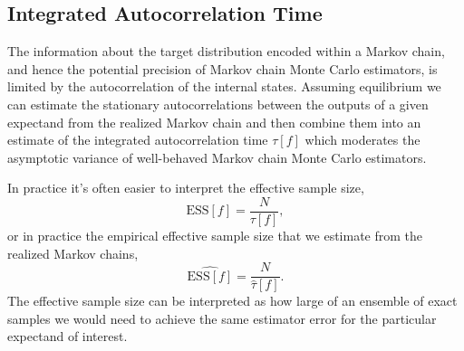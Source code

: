 \documentclass[
  letterpaper,
  DIV=11,
  numbers=noendperiod]{scrartcl}
\begin{document}
\hypertarget{integrated-autocorrelation-time}{%
\subsection{Integrated Autocorrelation
Time}\label{integrated-autocorrelation-time}}

The information about the target distribution encoded within a Markov
chain, and hence the potential precision of Markov chain Monte Carlo
estimators, is limited by the autocorrelation of the internal states.
Assuming equilibrium we can estimate the stationary autocorrelations
between the outputs of a given expectand from the realized Markov chain
and then combine them into an estimate of the integrated autocorrelation
time \(\tau[f]\) which moderates the asymptotic variance of well-behaved
Markov chain Monte Carlo estimators.

In practice it's often easier to interpret the effective sample size, \[
\text{ESS}[f] = \frac{N}{\tau[f]},
\] or in practice the empirical effective sample size that we estimate
from the realized Markov chains, \[
\hat{\text{ESS}[f]} = \frac{N}{\hat{\tau}[f]}.
\] The effective sample size can be interpreted as how large of an
ensemble of exact samples we would need to achieve the same estimator
error for the particular expectand of interest.
\end{document}
